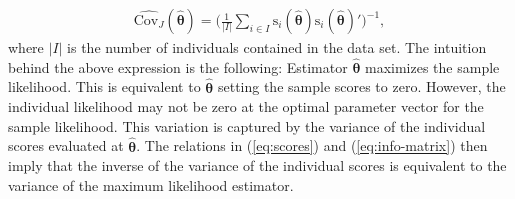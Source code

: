 \begin{align} \label{eq:est-cov}
\hat{\text{Cov}_J}(\pmb{\hat{\theta}}) = \bigg( \frac{1}{|I|} \sum_{i \in I} \text{s}_i(\pmb{\hat{\theta}})\text{s}_i(\pmb{\hat{\theta}})' \bigg)^{-1},
\end{align}
where $|I|$ is the number of individuals contained in the data set.
The intuition behind the above expression is the following: Estimator $\pmb{\hat{\theta}}$ maximizes the sample likelihood. This is equivalent to $\pmb{\hat{\theta}}$ setting the sample scores to zero. However, the individual likelihood may not be zero at the optimal parameter vector for the sample likelihood. This variation is captured by the variance of the individual scores evaluated at $\pmb{\hat{\theta}}$. The relations in (\ref{eq:scores}) and (\ref{eq:info-matrix}) then imply that the inverse of the variance of the individual scores is equivalent to the variance of the maximum likelihood estimator.